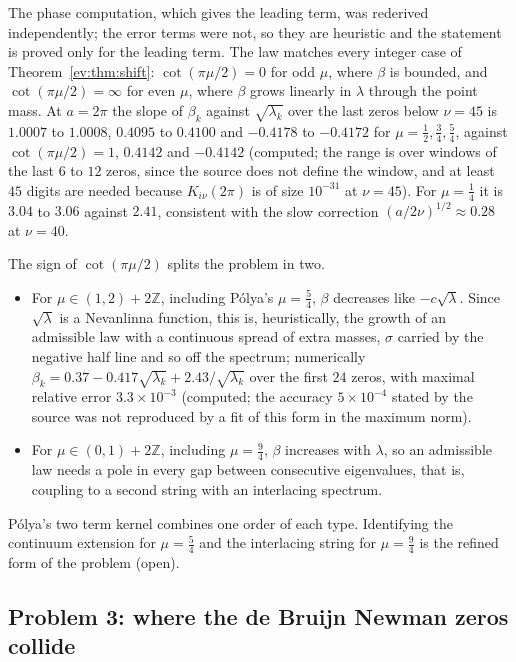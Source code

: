 The phase computation, which gives the leading term, was rederived independently; the error terms were not, so they are heuristic and the statement is proved only for the leading term. The law matches every integer case of Theorem~\ref{ev:thm:shift}: $\cot(\pi\mu/2)=0$ for odd $\mu$, where $\beta$ is bounded, and $\cot(\pi\mu/2)=\infty$ for even $\mu$, where $\beta$ grows linearly in $\lambda$ through the point mass. At $a=2\pi$ the slope of $\beta_k$ against $\sqrt{\lambda_k}$ over the last zeros below $\nu=45$ is $1.0007$ to $1.0008$, $0.4095$ to $0.4100$ and $-0.4178$ to $-0.4172$ for $\mu=\tfrac12,\tfrac34,\tfrac54$, against $\cot(\pi\mu/2)=1$, $0.4142$ and $-0.4142$ (computed; the range is over windows of the last $6$ to $12$ zeros, since the source does not define the window, and at least $45$ digits are needed because $K_{i\nu}(2\pi)$ is of size $10^{-31}$ at $\nu=45$). For $\mu=\tfrac14$ it is $3.04$ to $3.06$ against $2.41$, consistent with the slow correction $(a/2\nu)^{1/2}\approx0.28$ at $\nu=40$.

The sign of $\cot(\pi\mu/2)$ splits the problem in two.
\begin{itemize}
\item For $\mu\in(1,2)+2\mathbb Z$, including P\'olya's $\mu=\tfrac54$, $\beta$ decreases like $-c\sqrt\lambda$. Since $\sqrt\lambda$ is a Nevanlinna function, this is, heuristically, the growth of an admissible law with a continuous spread of extra masses, $\sigma$ carried by the negative half line and so off the spectrum; numerically $\beta_k=0.37-0.417\sqrt{\lambda_k}+2.43/\sqrt{\lambda_k}$ over the first $24$ zeros, with maximal relative error $3.3\times10^{-3}$ (computed; the accuracy $5\times10^{-4}$ stated by the source was not reproduced by a fit of this form in the maximum norm).
\item For $\mu\in(0,1)+2\mathbb Z$, including $\mu=\tfrac94$, $\beta$ increases with $\lambda$, so an admissible law needs a pole in every gap between consecutive eigenvalues, that is, coupling to a second string with an interlacing spectrum.
\end{itemize}
P\'olya's two term kernel combines one order of each type. Identifying the continuum extension for $\mu=\tfrac54$ and the interlacing string for $\mu=\tfrac94$ is the refined form of the problem (open).

\subsection{Problem 3: where the de Bruijn Newman zeros collide}

